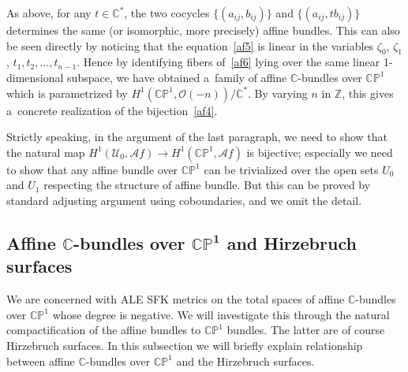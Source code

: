 \documentclass[pdftex]{sigma}
\numberwithin{equation}{section}
\begin{document}
As above, for any $t\in\mathbb{C}^*$, the two cocycles $\{(a_{ij}, b_{ij})\}$ and $\{(a_{ij}, tb_{ij})\}$ determines the
same (or isomorphic, more precisely) af\/f\/ine bundles.
This can also be seen directly by noticing that the equation~\eqref{af5} is linear in the variables
$\zeta_0$, $\zeta_1$, $t_1,t_2,\dots,t_{n-1}$.
Hence by identifying f\/ibers of~\eqref{af6} lying over the same linear 1-dimensional subspace, we have obtained
a~family of af\/f\/ine $\mathbb{C}$-bundles over $\mathbb{CP}^1$ which is parametrized by $H^1(\mathbb{CP}^1,\mathscr
O(-n))/\mathbb{C}^*$.
By varying $n$ in $\mathbb{Z}$, this gives a~concrete realization of the bijection~\eqref{af4}.

Strictly speaking, in the argument of the last paragraph, we need to show that the natural map $H^1(\mathscr
U_0,\mathscr Af)\to H^1(\mathbb{CP}^1,\mathscr Af)$ is bijective; especially we need to show that any af\/f\/ine bundle
over $\mathbb{CP}^1$ can be trivialized over the open sets $U_0$ and $U_1$ respecting the structure of af\/f\/ine
bundle.
But this can be proved by standard adjusting argument using coboundaries, and we omit the detail.

\subsection[Af\/f\/ine $\mathbb{C}$-bundles over $\mathbb{CP}^1$ and Hirzebruch surfaces]{Af\/f\/ine
$\boldsymbol{\mathbb{C}}$-bundles over $\boldsymbol{\mathbb{CP}^1}$ and Hirzebruch surfaces}
\label{ss:AH}

We are concerned with ALE SFK metrics on the total spaces of af\/f\/ine $\mathbb{C}$-bundles over $\mathbb{CP}^1$ whose
degree is negative.
We will investigate this through the natural compactif\/ication of the af\/f\/ine bundles to $\mathbb{CP}^1$ bundles.
The latter are of course Hirzebruch surfaces.
In this subsection we will brief\/ly explain relationship between af\/f\/ine $\mathbb{C}$-bundles over $\mathbb{CP}^1$
and the Hirzebruch surfaces.
\end{document}
